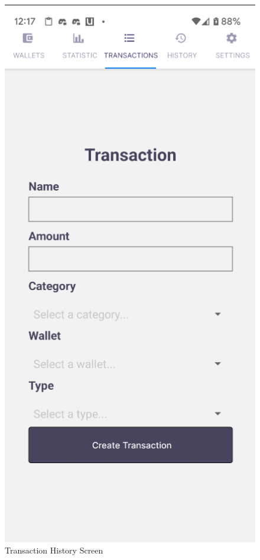 \begin{figure}[htbp]
\begin{minipage}[t]{0.2\textwidth}
        \caption{Transaction History Screen}
        \label{fig:transaction-history}
    \end{minipage}
    \hfill
    \begin{minipage}[t]{0.2\textwidth}
        \centering
        \includegraphics[width=\textwidth]{Screen Shots/Moneager/TransanctionCreatorScreen.png}

\end{minipage}
\end{figure}
